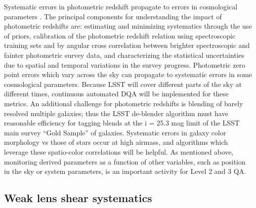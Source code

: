 \documentclass[SE,toc,lsstdraft]{lsstdoc}
\begin{document}
Systematic errors in photometric redshift propagate to errors in cosmological parameters \citep{2011ApJ...734...36A}. The principal components for understanding the impact of photometric redshifts are: estimating and minimizing systematics through the use of priors, calibration of the photometric redshift relation using spectroscopic training sets and by angular cross correlation between brighter spectroscopic and fainter photometric survey data, and characterizing the statistical uncertainties due to spatial and temporal variations in the survey progress.  Photometric zero point errors \citep{2010SPIE.7737E..1FJ} which vary across the sky can propagate to systematic errors in some cosmological parameters. Because LSST will cover different parts of the sky at different times, continuous automated DQA will be implemented for these metrics.
An additional challenge for photometric redshifts is blending of barely resolved multiple galaxies; thus the LSST de-blender algorithm must have reasonable efficiency for tagging blends at the i = 25.3 mag limit of the LSST main survey ``Gold Sample'' of galaxies.
Systematic errors in galaxy color morphology vs those of stars occur at high airmass, and algorithms which leverage these spatio-color correlations will be helpful.
As mentioned above, monitoring derived parameters as a function of other variables, such as position in the sky or system parameters, is an important activity for Level 2 and 3 QA.

\subsection{Weak lens shear systematics}
\end{document}
